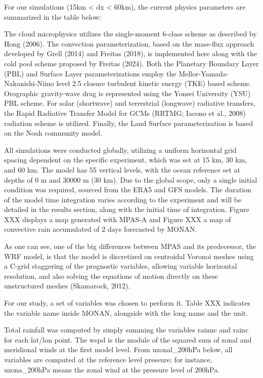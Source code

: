 For our simulations (15km < dx < 60km), the current physics parameters are summarized in the table below:


The cloud microphysics utilizes the single-moment 6-class scheme as described by Hong (2006). The convection parameterization, based on the mass-flux approach developed by Grell (2014) and Freitas (2018), is implemented here along with the cold pool scheme proposed by Freitas (2024). Both the Planetary Boundary Layer (PBL) and Surface Layer parameterizations employ the Mellor-Yamada-Nakanishi-Niino level 2.5 closure turbulent kinetic energy (TKE) based scheme. Orographic gravity-wave drag is represented using the Yonsei University (YSU) PBL scheme. For solar (shortwave) and terrestrial (longwave) radiative transfers, the Rapid Radiative Transfer Model for GCMs (RRTMG; Iacono et al., 2008) radiation scheme is utilized. Finally, the Land Surface parameterization is based on the Noah community model.

All simulations were conducted globally, utilizing a uniform horizontal grid spacing dependent on the specific experiment, which was set at 15 km, 30 km, and 60 km. The model has 55 vertical levels, with the ocean reference set at depths of 0 m and 30000 m (30 km). Due to the global scope, only a single initial condition was required, sourced from the ERA5 and GFS models. The duration of the model time integration varies according to the experiment and will be detailed in the results section, along with the initial time of integration. Figure XXX displays a map generated with MPAS-A and Figure XXX a map of convective rain accumulated of 2 days forecasted by MONAN.

As one can see, one of the big differences between MPAS and its predecessor, the WRF model, is that the model is discretized on centroidal Voronoi meshes using a C-grid staggering of the prognostic variables, allowing variable horizontal resolution, and also solving the equations of motion directly on these unstructured meshes (Skamarock, 2012). 

For our study, a set of variables was chosen to perform it. Table XXX indicates the variable name inside MONAN, alongside with the long name and the unit.


Total rainfall was computed by simply summing the variables rainnc and rainc for each lat/lon point. The wspd is the module of the squared sum of zonal and meridional winds at the first model level. From uzonal\_200hPa below, all variables are computed at the reference level pressure; for instance, uzona\_200hPa means the zonal wind at the pressure level of 200hPa.

